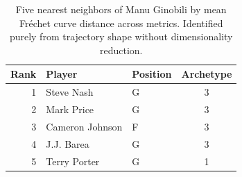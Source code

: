 \begin{table}[htbp]
  \centering\small
  \begin{tabular}{rllc}
    \toprule
    Rank & Player & Position & Archetype \\
    \midrule
    1 & Steve Nash & G & 3 \\
    2 & Mark Price & G & 3 \\
    3 & Cameron Johnson & F & 3 \\
    4 & J.J. Barea & G & 3 \\
    5 & Terry Porter & G & 1 \\
    \bottomrule
  \end{tabular}
  \caption{Five nearest neighbors of Manu Ginobili by mean Fr\'{e}chet curve distance across metrics. Identified purely from trajectory shape without dimensionality reduction.}
  \label{tab:Manu_Ginobili_frechet_curve_neighbors}
\end{table}

